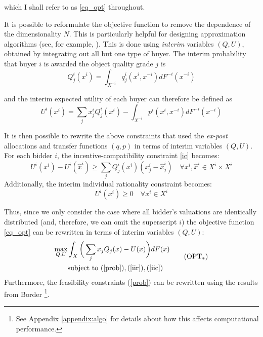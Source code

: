 \noindent which I shall refer to as \ref{eq_opt} throughout. 

It is possible to reformulate the objective function to remove the dependence of the dimensionality $N$. This is particularly helpful for designing approximation algorithms (see, for example, \cite{belloni2010multidimensional}). This is done using \textit{interim} variables $(Q, U)$, obtained by integrating out all but one type of buyer. The interim probability that buyer $i$ is awarded the object quality grade $j$ is
\begin{equation}
    Q_j^i(x^i) = \int_{X^{-i}} q_j^i(x^i,x^{-i}) dF^{-i}(x^{-i})
\end{equation}

\noindent and the interim expected utility of each buyer can therefore be defined as
\begin{equation}
    U^i(x^i) = \sum_j x_j^i Q_j^i(x^i) - \int_{X^{-i}} p^i(x^i,x^{-i}) dF^{-i}(x^{-i})
\end{equation}

It is then possible to rewrite the above constraints that used the \textit{ex-post} allocations and transfer functions $(q,p)$ in terms of interim variables $(Q,U)$. For each bidder $i$, the incentive-compatibility constraint \ref{ic} becomes:
\begin{equation}\label{iic}
    U^i(x^i) - U^i(\hat{x}^i) \geq \sum_j Q_j^i(x^i) (x_j^i - \hat{x}_j^i) \quad \forall x^i, \hat{x}^i \in X^i \times X^i \tag{IIC}
\end{equation}
\noindent Additionally, the interim individual rationality constraint becomes:
\begin{equation}\label{iir}
    U^i(x^i) \geq 0 \quad \forall x^i \in X^i \tag{IIR}
\end{equation}

Thus, since we only consider the case where all bidder's valuations are identically distributed (and, therefore, we can omit the superscript $i$) the objective function \ref{eq_opt} can be rewritten in terms of interim variables $(Q,U)$:
\begin{equation}
\begin{aligned}\label{eq_opt_interim}
    \max_{Q,U} &\int_X \bigg( \sum_j x_j Q_j(x) - U(x) \bigg) dF(x) \\
    &\text{subject to } (\ref{prob}), (\ref{iir}), (\ref{iic})
\end{aligned}  \tag{OPT$_*$} 
\end{equation}
\noindent Furthermore, the feasibility constraints (\ref{prob}) can be rewritten using the results from Border \autocite*{border1991implementation}\footnote{See Appendix \ref{appendix:algo} for details about how this affects computational performance.}.

